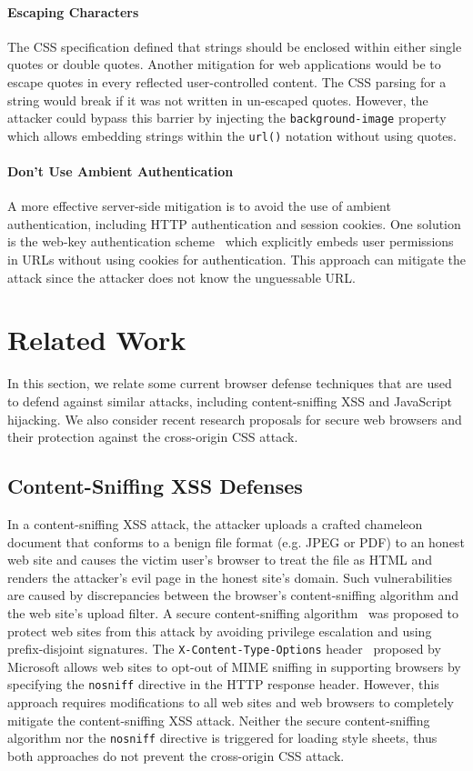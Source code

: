 \documentclass{acm_proc_article-sp}
\begin{document}
\paragraph{Escaping Characters}
The CSS specification defined that strings should be enclosed within either single quotes or double quotes. Another mitigation for web applications would be to escape quotes in every reflected user-controlled content. The CSS parsing for a string would break if it was not written in un-escaped quotes. However, the attacker could bypass this barrier by injecting the \texttt{background-image} property which allows embedding strings within the \texttt{url()} notation without using quotes.

\paragraph{Don't Use Ambient Authentication}
A more effective server-side mitigation is to avoid the use of ambient authentication, including HTTP authentication and session cookies. One solution is the web-key authentication scheme~\cite{webkey} which explicitly embeds user permissions in URLs without using cookies for authentication. This approach can mitigate the attack since the attacker does not know the unguessable URL.

\section{Related Work} \label{sec:relatedwork}
In this section, we relate some current browser defense techniques that are used to defend against similar attacks, including content-sniffing XSS and JavaScript hijacking. We also consider recent research proposals for secure web browsers and their protection against the cross-origin CSS attack.

\subsection{Content-Sniffing XSS Defenses}
In a content-sniffing XSS attack, the attacker uploads a crafted chameleon document that conforms to a benign file format (e.g. JPEG or PDF) to an honest web site and causes the victim user's browser to treat the file as HTML and renders the attacker's evil page in the honest site's domain. Such vulnerabilities are caused by discrepancies between the browser's content-sniffing algorithm and the web site's upload filter. A secure content-sniffing algorithm~\cite{securecontentsniffing} was proposed to protect web sites from this attack by avoiding privilege escalation and using prefix-disjoint signatures. The \texttt{X-Content-Type-Options} header~\cite{nosniff} proposed by Microsoft allows web sites to opt-out of MIME sniffing in supporting browsers by specifying the \texttt{nosniff} directive in the HTTP response header. However, this approach requires modifications to all web sites and web browsers to completely mitigate the content-sniffing XSS attack. Neither the secure content-sniffing algorithm nor the \texttt{nosniff} directive is triggered for loading style sheets, thus both approaches do not prevent the cross-origin CSS attack.
\end{document}
